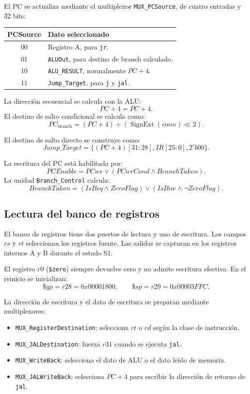 \documentclass[11pt,a4paper]{article}
\begin{document}
El PC se actualiza mediante el multiplexor \texttt{MUX\_PCSource}, de cuatro entradas y 32 bits:
\begin{center}
    \begin{tabularx}{0.9\textwidth}{cX}
        \toprule
        \textbf{PCSource} & \textbf{Dato seleccionado} \\
        \midrule
        00 & Registro A, para \texttt{jr}. \\
        01 & \texttt{ALUOut}, para destino de branch calculado. \\
        10 & \texttt{ALU\_RESULT}, normalmente $PC+4$. \\
        11 & \texttt{Jump\_Target}, para \texttt{j} y \texttt{jal}. \\
        \bottomrule
    \end{tabularx}
\end{center}

La dirección secuencial se calcula con la ALU:
\[
    PC+4 = PC + 4.
\]
El destino de salto condicional se calcula como:
\[
    PC_{\text{branch}} = (PC+4) + (\operatorname{SignExt}(imm)\ll 2).
\]

El destino de salto directo se construye como:
\[
    Jump\_Target = \{(PC+4)[31:28], IR[25:0], 2'b00\}.
\]

La escritura del PC está habilitada por:
\[
    PCEnable = PCwr \lor (PCwrCond \land BranchTaken).
\]
La unidad \texttt{Branch\_Control} calcula:
\[
    BranchTaken=(IsBeq\land ZeroFlag)\lor(IsBne\land\neg ZeroFlag).
\]

\subsection{Lectura del banco de registros}

El banco de registros tiene dos puertos de lectura y uno de escritura. Los campos $rs$ y $rt$ seleccionan los registros fuente. Las salidas se capturan en los registros internos A y B durante el estado S1.

El registro $r0$ (\texttt{\$zero}) siempre devuelve cero y no admite escritura efectiva. En el reinicio se inicializan:
\[
    \$gp=r28=0x00001800,\qquad \$sp=r29=0x00003FFC.
\]

La dirección de escritura y el dato de escritura se preparan mediante multiplexores:
\begin{itemize}
    \item \texttt{MUX\_RegisterDestination}: selecciona $rt$ o $rd$ según la clase de instrucción.
    \item \texttt{MUX\_JALDestination}: fuerza $r31$ cuando se ejecuta \texttt{jal}.
    \item \texttt{MUX\_WriteBack}: selecciona el dato de ALU o el dato leído de memoria.
    \item \texttt{MUX\_JALWriteBack}: selecciona $PC+4$ para escribir la dirección de retorno de \texttt{jal}.
\end{itemize}
\end{document}
